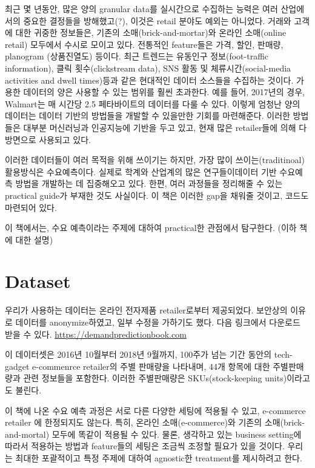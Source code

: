 \documentclass{report}
\begin{document}
최근 몇 년동안, 많은 양의 granular data를 실시간으로 수집하는 능력은 여러 산업에서의 중요한 결정들을 방해했고(?), 이것은 retail 분야도 예외는 아니었다.
거래와 고객에 대한 귀중한 정보들은, 기존의 소매(brick-and-mortar)와 온라인 소매(online retail) 모두에서 수시로 모이고 있다.
전통적인 feature들은 가격, 할인, 판매량, planogram (상품진열도)  등이다.
최근 트렌드는 유동인구 정보(foot-traffic information), 클릭 횟수(clickstream data), SNS 활동 및 체류시간(social-media activities and dwell times)등과 같은 현대적인 데이터 소스들을 수집하는 것이다.
가용한 데이터의 양은 사용할 수 있는 범위를 훨씬 초과한다.
예를 들어, 2017년의 경우, Walmart는 매 시간당 2.5 페타바이트의 데이터를 다룰 수 있다.
이렇게 엄청난 양의 데이터는 데이터 기반의 방법들을 개발할 수 있을만한 기회를 마련해준다.
이러한 방법들은 대부분 머신러닝과 인공지능에 기반을 두고 있고, 현재 많은 retailer들에 의해 다방면으로 사용되고 있다.

이러한 데이터들이 여러 목적을 위해 쓰이기는 하지만, 가장 많이 쓰이는(traditinoal) 활용방식은 수요예측이다.
실제로 학계와 산업계의 많은 연구들이데이터 기반 수요예측 방법을 개발하는 데 집중해오고 있다.
한편, 여러 과정들을 정리해줄 수 있는 practical guide가 부재한 것도 사실이다. 이 책은 이러한 gap을 채워줄 것이고, 코드도 마련되어 있다.

이 책에서는, 수요 예측이라는 주제에 대하여 practical한 관점에서 탐구한다. (이하 책에 대한 설명)

\section{Dataset}
우리가 사용하는 데이터는 온라인 전자제품 retailer로부터 제공되었다.
보안상의 이유로 데이터를 anonymize하였고, 일부 수정을 가하기도 했다.
다음 링크에서 다운로드 받을 수 있다.
\url{https://demandpredictionbook.com}

이 데이터셋은 2016년 10월부터 2018년 9월까지, 100주가 넘는 기간 동안의 tech-gadget e-commenrce retailer의 주별 판매량을 나타내며, 44개 항목에 대한 주별판매량과 관련 정보들을 포함한다.
이러한 주별판매량은 SKUs(stock-keeping units)이라고도 불린다.

이 책에 나온 수요 예측 과정은 서로 다른 다양한 세팅에 적용될 수 있고, e-commerce retailer 에 한정되지도 않는다.
특히, 온라인 소매(e-commerce)와 기존의 소매(brick-and-mortal) 모두에 똑같이 적용될 수 있다.
물론, 생각하고 있는 business setting에 따라서 적용하는 방법과 feature들의 세팅은 조금씩 조정할 필요가 있을 것이다.
우리는 최대한 포괄적이고 특정 주제에 대하여 agnostic한 treatment를 제시하려고 한다.
\end{document}
